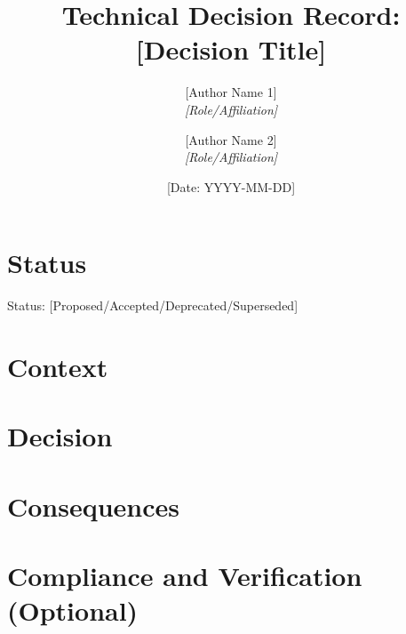 \documentclass{article} %
\title{Technical Decision Record: [Decision Title]}
\author{
    [Author Name 1] \\ \textit{[Role/Affiliation]} \and
    [Author Name 2] \\ \textit{[Role/Affiliation]}
}
\date{[Date: YYYY-MM-DD]}
\begin{document}
\maketitle %



\section*{Status}
Status: [Proposed/Accepted/Deprecated/Superseded]

\section{Context}

\section{Decision}

\section{Consequences}

\section{Compliance and Verification (Optional)}
\end{document}
